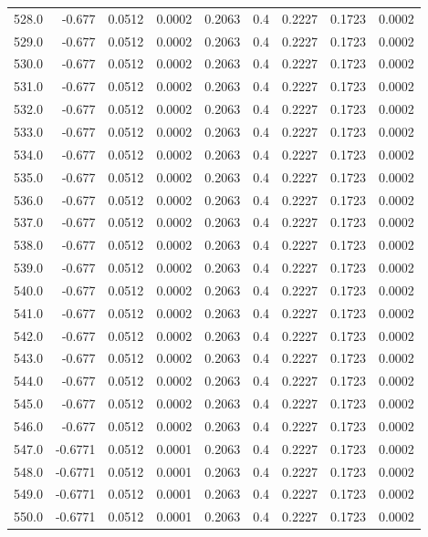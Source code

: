 \begin{longtable}{lrrrrrrrr}
528.0 & -0.677 & 0.0512 & 0.0002 & 0.2063 & 0.4 & 0.2227 & 0.1723 & 0.0002 \\
529.0 & -0.677 & 0.0512 & 0.0002 & 0.2063 & 0.4 & 0.2227 & 0.1723 & 0.0002 \\
530.0 & -0.677 & 0.0512 & 0.0002 & 0.2063 & 0.4 & 0.2227 & 0.1723 & 0.0002 \\
531.0 & -0.677 & 0.0512 & 0.0002 & 0.2063 & 0.4 & 0.2227 & 0.1723 & 0.0002 \\
532.0 & -0.677 & 0.0512 & 0.0002 & 0.2063 & 0.4 & 0.2227 & 0.1723 & 0.0002 \\
533.0 & -0.677 & 0.0512 & 0.0002 & 0.2063 & 0.4 & 0.2227 & 0.1723 & 0.0002 \\
534.0 & -0.677 & 0.0512 & 0.0002 & 0.2063 & 0.4 & 0.2227 & 0.1723 & 0.0002 \\
535.0 & -0.677 & 0.0512 & 0.0002 & 0.2063 & 0.4 & 0.2227 & 0.1723 & 0.0002 \\
536.0 & -0.677 & 0.0512 & 0.0002 & 0.2063 & 0.4 & 0.2227 & 0.1723 & 0.0002 \\
537.0 & -0.677 & 0.0512 & 0.0002 & 0.2063 & 0.4 & 0.2227 & 0.1723 & 0.0002 \\
538.0 & -0.677 & 0.0512 & 0.0002 & 0.2063 & 0.4 & 0.2227 & 0.1723 & 0.0002 \\
539.0 & -0.677 & 0.0512 & 0.0002 & 0.2063 & 0.4 & 0.2227 & 0.1723 & 0.0002 \\
540.0 & -0.677 & 0.0512 & 0.0002 & 0.2063 & 0.4 & 0.2227 & 0.1723 & 0.0002 \\
541.0 & -0.677 & 0.0512 & 0.0002 & 0.2063 & 0.4 & 0.2227 & 0.1723 & 0.0002 \\
542.0 & -0.677 & 0.0512 & 0.0002 & 0.2063 & 0.4 & 0.2227 & 0.1723 & 0.0002 \\
543.0 & -0.677 & 0.0512 & 0.0002 & 0.2063 & 0.4 & 0.2227 & 0.1723 & 0.0002 \\
544.0 & -0.677 & 0.0512 & 0.0002 & 0.2063 & 0.4 & 0.2227 & 0.1723 & 0.0002 \\
545.0 & -0.677 & 0.0512 & 0.0002 & 0.2063 & 0.4 & 0.2227 & 0.1723 & 0.0002 \\
546.0 & -0.677 & 0.0512 & 0.0002 & 0.2063 & 0.4 & 0.2227 & 0.1723 & 0.0002 \\
547.0 & -0.6771 & 0.0512 & 0.0001 & 0.2063 & 0.4 & 0.2227 & 0.1723 & 0.0002 \\
548.0 & -0.6771 & 0.0512 & 0.0001 & 0.2063 & 0.4 & 0.2227 & 0.1723 & 0.0002 \\
549.0 & -0.6771 & 0.0512 & 0.0001 & 0.2063 & 0.4 & 0.2227 & 0.1723 & 0.0002 \\
550.0 & -0.6771 & 0.0512 & 0.0001 & 0.2063 & 0.4 & 0.2227 & 0.1723 & 0.0002 \\

\end{longtable}
